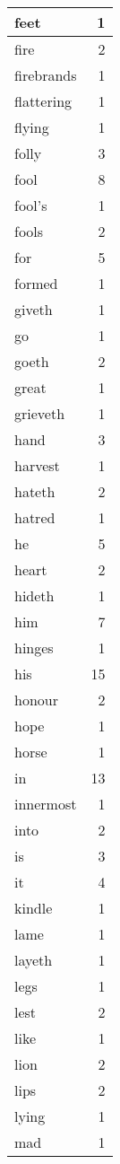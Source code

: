 \begin{center}
\begin{longtable}{l|r}
feet & 1\\ \hline 
fire & 2\\ \hline 
firebrands & 1\\ \hline 
flattering & 1\\ \hline 
flying & 1\\ \hline 
folly & 3\\ \hline 
fool & 8\\ \hline 
fool's & 1\\ \hline 
fools & 2\\ \hline 
for & 5\\ \hline 
formed & 1\\ \hline 
giveth & 1\\ \hline 
go & 1\\ \hline 
goeth & 2\\ \hline 
great & 1\\ \hline 
grieveth & 1\\ \hline 
hand & 3\\ \hline 
harvest & 1\\ \hline 
hateth & 2\\ \hline 
hatred & 1\\ \hline 
he & 5\\ \hline 
heart & 2\\ \hline 
hideth & 1\\ \hline 
him & 7\\ \hline 
hinges & 1\\ \hline 
his & 15\\ \hline 
honour & 2\\ \hline 
hope & 1\\ \hline 
horse & 1\\ \hline 
in & 13\\ \hline 
innermost & 1\\ \hline 
into & 2\\ \hline 
is & 3\\ \hline 
it & 4\\ \hline 
kindle & 1\\ \hline 
lame & 1\\ \hline 
layeth & 1\\ \hline 
legs & 1\\ \hline 
lest & 2\\ \hline 
like & 1\\ \hline 
lion & 2\\ \hline 
lips & 2\\ \hline 
lying & 1\\ \hline 
mad & 1\\ \hline 

\end{longtable}
\end{center}
